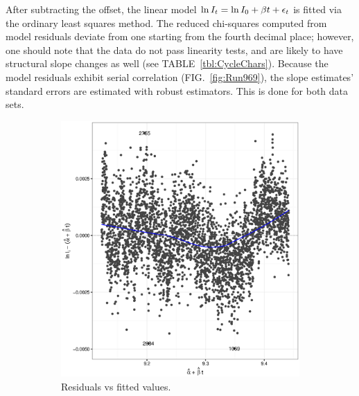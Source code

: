 \documentclass[reprint]{revtex4-1}
\newcommand{\scl}{.4}
\begin{document}
After subtracting the offset, the linear model $\ln I_t = \ln I_0 + \slp t +\epsilon_t$ is fitted via the ordinary least squares method. The reduced chi-squares computed from model residuals deviate from one starting from the fourth decimal place; however, one should note that the data do not pass linearity tests, and are likely to have structural slope changes as well (see TABLE~\ref{tbl:CycleChars}). Because the model residuals exhibit serial correlation (FIG.~\ref{fig:Run969}), the slope estimates' standard errors are estimated with robust estimators. This is done for both data sets.

\begin{figure}
\centering
\begin{subfigure}{.5\textwidth}
\includegraphics[scale=\scl]{img/Run969_Res_VS_Fit.eps}
\caption{Residuals vs fitted values.}
\end{subfigure}
\begin{subfigure}{.5\textwidth}

\end{subfigure}
\end{figure}
\end{document}
